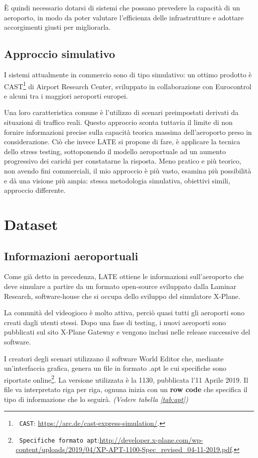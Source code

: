 \documentclass[a4paper, 12pt]{article}
\begin{document}
È quindi necessario dotarsi di sistemi che possano prevedere la capacità di un aeroporto, in modo da poter valutare l’efficienza delle infrastrutture e adottare accorgimenti giusti per migliorarla.

\subsection{Approccio simulativo}
I sistemi attualmente in commercio sono di tipo simulativo: un ottimo prodotto è CAST\footnote{\texttt{ CAST}: \url{https://arc.de/cast-express-simulation/}.} di Airport Research Center, sviluppato in collaborazione con Eurocontrol e alcuni tra i maggiori aeroporti europei.

Una loro caratteristica comune è l’utilizzo di scenari preimpostati derivati da situazioni di traffico reali. Questo approccio sconta tuttavia il limite di non fornire informazioni precise sulla capacità teorica massima dell’aeroporto preso in considerazione. 
Ciò che invece LATE si propone di fare, è applicare la tecnica dello stress testing, sottoponendo il modello aeroportuale ad un aumento progressivo dei carichi per constatarne la risposta. 
Meno pratico e più teorico, non avendo fini commerciali, il mio approccio è più vasto, esamina più possibilità e dà una visione più ampia: stessa metodologia simulativa, obiettivi simili, approccio differente.

\newpage

\section{Dataset}

	\subsection{Informazioni aeroportuali}
	
		Come già detto in precedenza, LATE ottiene le informazioni sull’aeroporto che deve simulare a partire da un formato open-source sviluppato dalla Laminar Research, software-house che si occupa dello sviluppo del simulatore X-Plane.
		
		La comunità del videogioco è molto attiva, perciò quasi tutti gli aeroporti sono creati dagli utenti stessi. Dopo una fase di testing, i nuovi aeroporti sono pubblicati sul sito X-Plane Gateway e vengono inclusi nelle release successive del software.
		 
		I creatori degli scenari utilizzano il software World Editor che, mediante un’interfaccia grafica, genera un file in formato .apt le cui specifiche sono riportate online\footnote{\texttt { Specifiche formato apt}:\url{http://developer.x-plane.com/wp-content/uploads/2019/04/XP-APT-1100-Spec_revised_04-11-2019.pdf}.}. La versione utilizzata è la 1130, pubblicata l'11 Aprile 2019.
		Il file va interpretato riga per riga, ognuna inizia con un \textbf{row code} che specifica il tipo di informazione che lo seguirà. \textit{(Vedere tabella \ref{tab:apt})}
\end{document}

